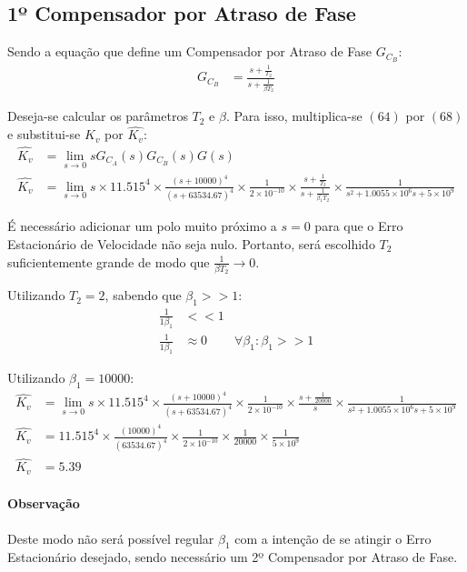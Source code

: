 \documentclass[a4paper]{article}
\begin{document}
 \subsection{1º Compensador por Atraso de Fase}
 \par Sendo a equação que define um Compensador por Atraso de Fase $G_{C_B}$:
 \begin{align}
 G_{C_B} &= \frac{s+\frac{1}{T_2}}{s+\frac{1}{\beta T_2}}
 \end{align}
  \vspace{0.5em}
 \par Deseja-se calcular os parâmetros $T_2$ e $\beta$. Para isso, multiplica-se $(64)$ por $(68)$ e substitui-se ${K_v}$ por $\hat{K_v}$:
 \begin{align}
  \hat{K_v} &= \lim_{s \to 0} sG_{C_A}(s)G_{C_B}(s)G(s) \\
   \hat{K_v}  &= \lim_{s \to 0} s\times11.515^4 \times \frac{(s+10000)^4}{(s+63534.67)^4}\times\frac{1}{2\times10^{-10}}\times\frac{s+\frac{1}{T_2}}{s+\frac{1}{\beta_1 T_2}}\times\frac{1}{s^2 + 1.0055\times10^{6}s+5\times10^9}
 \end{align}
 \vspace{0.5em}
\par É necessário adicionar um polo muito próximo a $s=0$ para que o Erro Estacionário de Velocidade não seja nulo. Portanto, será escolhido $T_2$ suficientemente grande de modo que $\frac{1}{\beta T_2} \to 0$.
\par Utilizando $T_2=2$, sabendo que $\beta_1 >> 1$:
 \begin{align}
	\frac{1}{1\beta_1}& << 1 \\
	\frac{1}{1\beta_1}&\approx 0 & \forall \beta_1  : \beta_1 >> 1
\end{align}
\vspace{0.5em}
\par Utilizando $\beta_1=10000$:
\begin{align}
\hat{K_v}  &= \lim_{s \to 0} s\times11.515^4 \times \frac{(s+10000)^4}{(s+63534.67)^4}\times\frac{1}{2\times10^{-10}}\times\frac{s+\frac{1}{20000}}{s}\times\frac{1}{s^2 + 1.0055\times10^{6}s+5\times10^9} \\
\hat{K_v} &= 11.515^4 \times \frac{(10000)^4}{(63534.67)^4}\times\frac{1}{2\times10^{-10}}\times\frac{1}{20000}\times\frac{1}{5\times10^9} \\
\hat{K_v} &= 5.39
\end{align}
\paragraph{Observação} Deste modo não será possível regular $\beta_1$ com a intenção de se atingir o Erro Estacionário desejado, sendo necessário um 2º Compensador por Atraso de Fase.
\end{document}
